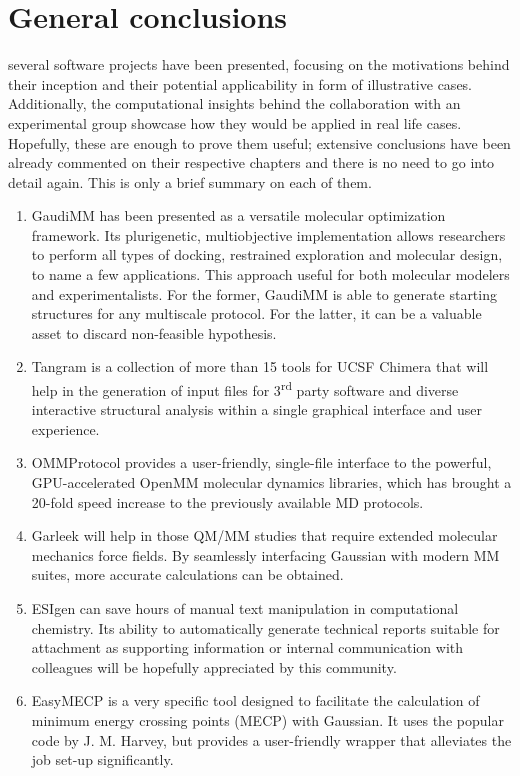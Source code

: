 \chapter{General conclusions}
\label{chap:07}

 several software projects have been presented, focusing on the motivations behind their inception and their potential applicability in form of illustrative cases. Additionally, the computational insights behind the collaboration with an experimental group showcase how they would be applied in real life cases. Hopefully, these are enough to prove them useful; extensive conclusions have been already commented on their respective chapters and there is no need to go into detail again. This is only a brief summary on each of them.

\begin{enumerate}
	\item GaudiMM has been presented as a versatile molecular optimization framework. Its plurigenetic, multiobjective implementation allows researchers to perform all types of docking, restrained exploration and molecular design, to name a few applications. This approach useful for both molecular modelers and experimentalists. For the former, GaudiMM is able to generate starting structures for any multiscale protocol. For the latter, it can be a valuable asset to discard non-feasible hypothesis.

	\item Tangram is a collection of more than 15 tools for UCSF Chimera that will help in the generation of input files for 3\textsuperscript{rd} party software and diverse interactive structural analysis within a single graphical interface and user experience.

	\item OMMProtocol provides a user-friendly, single-file interface to the powerful, GPU-accelerated OpenMM molecular dynamics libraries, which has brought a 20-fold speed increase to the previously available MD protocols.

	\item Garleek will help in those QM/MM studies that require extended molecular mechanics force fields. By seamlessly interfacing Gaussian with modern MM suites, more accurate calculations can be obtained.

	\item ESIgen can save hours of manual text manipulation in computational chemistry. Its ability to automatically generate technical reports suitable for attachment as supporting information or internal communication with colleagues will be hopefully appreciated by this community.

	\item EasyMECP is a very specific tool designed to facilitate the calculation of minimum energy crossing points (MECP) with Gaussian. It uses the popular code by J. M. Harvey, but provides a user-friendly wrapper that alleviates the job set-up significantly.
\end{enumerate}

